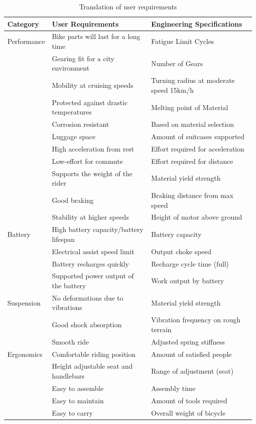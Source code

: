 \documentclass[a4paper,11pt]{article}
\begin{document}
\begin{table}[!ht]
	\centering
	\caption{Translation of user requirements}
	\begin{tabular}{l l l}
		\hline
		Category&User Requirements&Engineering Specifications\\\hline
	Performance&Bike parts will last for a long time&Fatigue Limit Cycles\\
		   &Gearing fit for a city environment&Number of Gears\\
		&Mobility at cruising speeds&Turning radius at moderate speed 15km/h\\
		&Protected against drastic temperatures&Melting point of Material\\
		&Corrosion resistant&Based on material selection\\
		&Luggage space&Amount of suitcases supported\\
		&High acceleration from rest&Effort required for acceleration\\
		&Low-effort for commute&Effort required for distance\\
		&Supports the weight of the rider&Material yield strength\\
		&Good braking&Braking distance from max speed\\
		&Stability at higher speeds&Height of motor above ground\\\hline
	Battery&High battery capacity/battery lifespan&Battery capacity\\
		&Electrical assist speed limit&Output choke speed\\
		&Battery recharges quickly&Recharge cycle time (full)\\
		&Supported power output of the battery&Work output by battery\\\hline
	Suspension&No deformations due to vibrations&Material yield strength\\
		&Good shock absorption&Vibration frequency on rough terrain\\
		&Smooth ride&Adjusted spring stiffness\\\hline
	Ergonomics&Comfortable riding position&Amount of satisfied people\\
		  &Height adjustable seat and handlebars&Range of adjustment (seat)\\
		&Easy to assemble&Assembly time\\
		&Easy to maintain&Amount of tools required\\
		&Easy to carry&Overall weight of bicycle\\
	\end{tabular}
\end{table}
\end{document}
